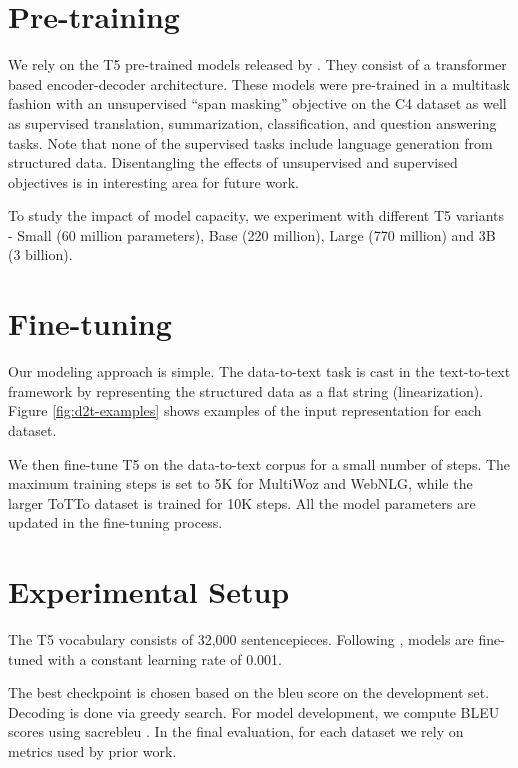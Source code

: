 \documentclass[11pt,a4paper]{article}
\begin{document}
\section{Pre-training}
We rely on the T5 pre-trained models released by \citet{raffel2019exploring}. They consist of a transformer based encoder-decoder architecture. These models were pre-trained in a multitask fashion with an unsupervised “span masking” objective on the C4 dataset as well as supervised translation,
summarization, classification, and question answering tasks. Note that none of the supervised tasks include language generation from structured data. Disentangling the effects of unsupervised and supervised objectives is in interesting area for future work.
\par To study the impact of model capacity, we experiment  with different T5 variants - Small (60 million parameters), Base (220 million), Large (770 million) and 3B (3 billion).



\section{Fine-tuning}
Our modeling approach is simple. The data-to-text task is cast in the text-to-text framework by representing the structured data as a flat string (linearization). Figure \ref{fig:d2t-examples} shows examples of the input representation for each dataset. 
\par We then fine-tune T5 on the data-to-text corpus for a small number of steps. The maximum training steps is set to 5K for MultiWoz and WebNLG, while the larger ToTTo dataset is trained for 10K steps. All the model parameters are updated in the fine-tuning process. 



\section{Experimental Setup}
The T5 vocabulary consists of 32,000 sentencepieces. Following \cite{raffel2019exploring}, models are fine-tuned with a constant learning rate of 0.001. 
\par The best checkpoint is chosen based on the bleu score on the development set. Decoding is done via greedy search. For model development, we compute BLEU \cite{papineni2002bleu} scores using sacrebleu \cite{post2018call}. In the final evaluation, for each dataset we rely on metrics used by prior work.
\end{document}
